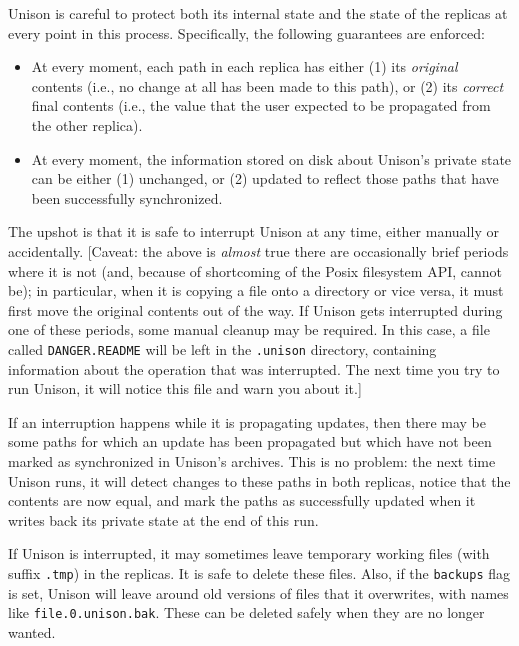 \documentclass{article}
\begin{document}

Unison is careful to protect both its internal state and the state of
the replicas at every point in this process.  Specifically, the
following guarantees are enforced:
\begin{itemize}
\item At every moment, each path in each replica has either (1) its {\em
  original} contents (i.e., no change at all has been made to this
path), or (2) its {\em correct} final contents (i.e., the value that the
user expected to be propagated from the other replica).
\item At every moment, the information stored on disk about Unison's
private state can be either (1) unchanged, or (2) updated to reflect
those paths that have been successfully synchronized.
\end{itemize}
The upshot is that it is safe to interrupt Unison at any time, either
manually or accidentally.  [Caveat: the above is {\em almost} true there
are occasionally brief periods where it is not (and, because of
shortcoming of the Posix filesystem API, cannot be); in particular, when
it is copying a file onto a directory or vice versa, it must first move
the original contents out of the way.  If Unison gets
interrupted during one of these periods, some manual cleanup may be
required.  In this case, a file called {\tt DANGER.README} will be left
in the {\tt .unison} directory, containing information about the operation that
was interrupted. The next time you try to run Unison, it will notice this
file and warn you about it.]

If an interruption happens while it is propagating updates, then there
may be some paths for which an update has been propagated but which
have not been marked as synchronized in Unison's archives.  This is no
problem: the next time Unison runs, it will detect changes to these
paths in both replicas, notice that the contents are now equal, and
mark the paths as successfully updated when it writes back its private
state at the end of this run.

If Unison is interrupted, it may sometimes leave temporary working files
(with suffix \verb|.tmp|) in the replicas.  It is safe to delete these
files.  Also, if the \verb|backups| flag is set, Unison will
leave around old versions of files that it overwrites, with names like
\verb|file.0.unison.bak|.  These can be deleted safely when they are no
longer wanted.
\end{document}

